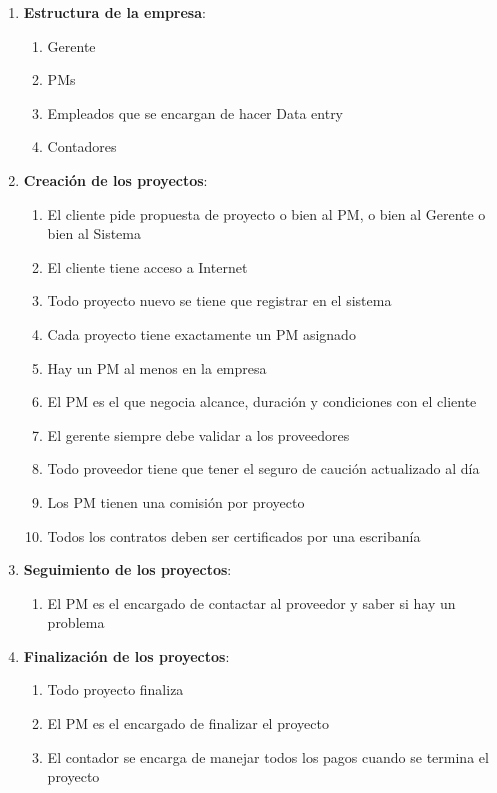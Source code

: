 \begin{enumerate}
    \item \textbf{Estructura de la empresa}:
    \begin{enumerate}
        \item Gerente
        \item PMs
        \item Empleados que se encargan de hacer Data entry
        \item Contadores
    \end{enumerate}    
    \item \textbf{Creación de los proyectos}:
    \begin{enumerate}
        \item El cliente pide propuesta de proyecto o bien al PM, o bien al Gerente o bien al Sistema
        \item El cliente tiene acceso a Internet
        \item Todo proyecto nuevo se tiene que registrar en el sistema
        \item Cada proyecto tiene exactamente un PM asignado
        \item Hay un PM al menos en la empresa
        \item El PM es el que negocia alcance, duración y condiciones con el cliente
        \item El gerente siempre debe validar a los proveedores
        \item Todo proveedor tiene que tener el seguro de caución actualizado al día
        \item Los PM tienen una comisión por proyecto
        \item Todos los contratos deben ser certificados por una escribanía
    \end{enumerate}    
    \item \textbf{Seguimiento de los proyectos}:
    \begin{enumerate}
        \item El PM es el encargado de contactar al proveedor y saber si hay un problema
    \end{enumerate}
    \item \textbf{Finalización de los proyectos}:
    \begin{enumerate}
        \item Todo proyecto finaliza
        \item El PM es el encargado de finalizar el proyecto
        \item El contador se encarga de manejar todos los pagos cuando se termina el proyecto
    \end{enumerate}
\end{enumerate}


